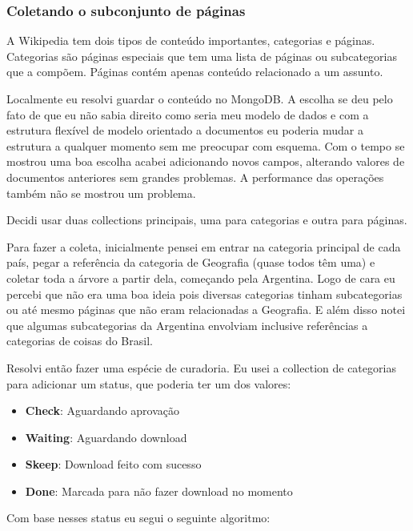 \subsubsection{Coletando o subconjunto de páginas}

A Wikipedia tem dois tipos de conteúdo importantes, categorias e páginas. Categorias são páginas especiais que tem uma lista de páginas ou subcategorias que a compõem. Páginas contém apenas conteúdo relacionado a um assunto.

Localmente eu resolvi guardar o conteúdo no MongoDB. A escolha se deu pelo fato de que eu não sabia direito como seria meu modelo de dados e com a estrutura flexível de modelo orientado a documentos eu poderia mudar a estrutura a qualquer momento sem me preocupar com esquema. Com o tempo se mostrou uma boa escolha acabei adicionando novos campos, alterando valores de documentos anteriores sem grandes problemas. A performance das operações também não se mostrou um problema.

Decidi usar duas collections principais, uma para categorias e outra para páginas.

Para fazer a coleta, inicialmente pensei em entrar na categoria principal de cada país, pegar a referência da categoria de Geografia (quase todos têm uma) e coletar toda a árvore a partir dela, começando pela Argentina. Logo de cara eu percebi que não era uma boa ideia pois diversas categorias tinham subcategorias ou até mesmo páginas que não eram relacionadas a Geografia. E além disso notei que algumas subcategorias da Argentina envolviam inclusive referências a categorias de coisas do Brasil. 

Resolvi então fazer uma espécie de curadoria. Eu usei a collection de categorias para adicionar um status, que poderia ter um dos valores:

\begin{itemize}
    \item \textbf{Check}: Aguardando aprovação
    \item \textbf{Waiting}: Aguardando download
    \item \textbf{Skeep}: Download feito com sucesso
    \item \textbf{Done}: Marcada para não fazer download no momento
\end{itemize}

Com base nesses status eu segui o seguinte algoritmo: 

